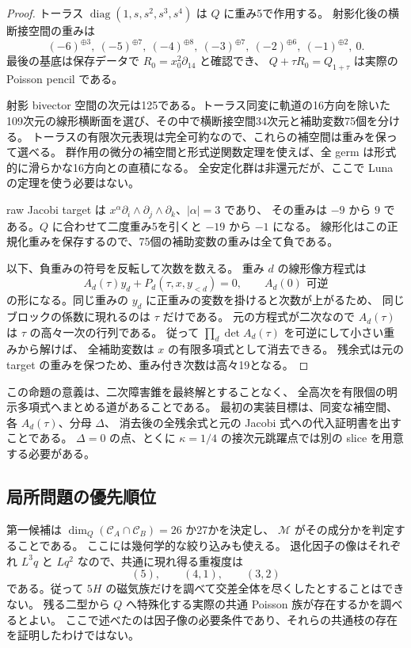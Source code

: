 \documentclass[11pt,a4paper]{ltjsarticle}
\DeclareMathOperator{\diag}{diag}\DeclareMathOperator{\Sym}{Sym}
\theoremstyle{remark}\newtheorem{remark}[proposition]{注意}
\begin{document}
\begin{proof}
トーラス $\diag(1,s,s^2,s^3,s^4)$ は $Q$ に重み5で作用する。
射影化後の横断接空間の重みは
\[
 (-6)^{\oplus3},\ (-5)^{\oplus7},\ (-4)^{\oplus8},\
 (-3)^{\oplus7},\ (-2)^{\oplus6},\ (-1)^{\oplus2},\ 0.
\]
最後の基底は保存データで $R_0=x_0^2\partial_{14}$ と確認でき、
$Q+\tau R_0=Q_{1+\tau}$ は実際の Poisson pencil である。

射影 bivector 空間の次元は125である。トーラス同変に軌道の16方向を除いた
109次元の線形横断面を選び、その中で横断接空間34次元と補助変数75個を分ける。
トーラスの有限次元表現は完全可約なので、これらの補空間は重みを保って選べる。
群作用の微分の補空間と形式逆関数定理を使えば、全 germ は形式的に滑らかな16方向との直積になる。
全安定化群は非還元だが、ここで Luna の定理を使う必要はない。

raw Jacobi target は $x^\alpha\partial_i\wedge\partial_j\wedge\partial_k$、$|\alpha|=3$ であり、
その重みは $-9$ から $9$ である。$Q$ に合わせて二度重み5を引くと $-19$ から $-1$ になる。
線形化はこの正規化重みを保存するので、75個の補助変数の重みは全て負である。

以下、負重みの符号を反転して次数を数える。
重み $d$ の線形像方程式は
\[
 A_d(\tau)y_d+P_d(\tau,x,y_{<d})=0,
 \qquad A_d(0)\text{ 可逆}
\]
の形になる。同じ重みの $y_d$ に正重みの変数を掛けると次数が上がるため、
同じブロックの係数に現れるのは $\tau$ だけである。
元の方程式が二次なので $A_d(\tau)$ は $\tau$ の高々一次の行列である。
従って $\prod_d\det A_d(\tau)$ を可逆にして小さい重みから解けば、
全補助変数は $x$ の有限多項式として消去できる。
残余式は元の target の重みを保つため、重み付き次数は高々19となる。
\end{proof}

この命題の意義は、二次障害錐を最終解とすることなく、
全高次を有限個の明示多項式へまとめる道があることである。
最初の実装目標は、同変な補空間、各 $A_d(\tau)$、分母 $\Delta$、
消去後の全残余式と元の Jacobi 式への代入証明書を出すことである。
$\Delta=0$ の点、とくに $\kappa=1/4$ の接次元跳躍点では別の slice を用意する必要がある。

\subsection{局所問題の優先順位}

第一候補は $\dim_Q(\mathcal C_A\cap\mathcal C_B)=26$ か27かを決定し、
$\mathcal M$ がその成分かを判定することである。
ここには幾何学的な絞り込みも使える。
退化因子の像はそれぞれ $L^3q$ と $Lq^2$ なので、共通に現れ得る重複度は
\[
 (5),\qquad(4,1),\qquad(3,2)
\]
である。従って $5H$ の磁気族だけを調べて交差全体を尽くしたとすることはできない。
残る二型から $Q$ へ特殊化する実際の共通 Poisson 族が存在するかを調べるとよい。
ここで述べたのは因子像の必要条件であり、それらの共通枝の存在を証明したわけではない。
\end{document}
